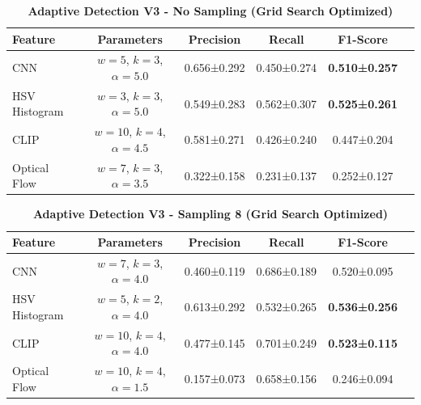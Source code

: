 \documentclass[11pt,a4paper]{article}
\begin{document}
\begin{table}[H]
\centering
\caption{\colorbox{bestresult}{\textbf{Adaptive Detection V3 - No Sampling (Grid Search Optimized)}}}
\label{tab:adaptive_v3_no_sampling}
\small
\begin{tabular}{lccccc}
\toprule
\textbf{Feature} & \textbf{Parameters} & \textbf{Precision} & \textbf{Recall} & \textbf{F1-Score} \\
\midrule
\rowcolor{bestresult}
CNN & $w=5$, $k=3$, $\alpha=5.0$ & 0.656±0.292 & 0.450±0.274 & \textbf{0.510±0.257} \\
\rowcolor{bestresult}
HSV Histogram & $w=3$, $k=3$, $\alpha=5.0$ & 0.549±0.283 & 0.562±0.307 & \textbf{0.525±0.261} \\
CLIP & $w=10$, $k=4$, $\alpha=4.5$ & 0.581±0.271 & 0.426±0.240 & 0.447±0.204 \\
Optical Flow & $w=7$, $k=3$, $\alpha=3.5$ & 0.322±0.158 & 0.231±0.137 & 0.252±0.127 \\
\bottomrule
\end{tabular}
\end{table}

\begin{table}[H]
\centering
\caption{\colorbox{bestresult}{\textbf{Adaptive Detection V3 - Sampling 8 (Grid Search Optimized)}}}
\label{tab:adaptive_v3_sampling}
\small
\begin{tabular}{lccccc}
\toprule
\textbf{Feature} & \textbf{Parameters} & \textbf{Precision} & \textbf{Recall} & \textbf{F1-Score} \\
\midrule
CNN & $w=7$, $k=3$, $\alpha=4.0$ & 0.460±0.119 & 0.686±0.189 & 0.520±0.095 \\
\rowcolor{bestresult}
HSV Histogram & $w=5$, $k=2$, $\alpha=4.0$ & 0.613±0.292 & 0.532±0.265 & \textbf{0.536±0.256} \\
\rowcolor{bestresult}
CLIP & $w=10$, $k=4$, $\alpha=4.0$ & 0.477±0.145 & 0.701±0.249 & \textbf{0.523±0.115} \\
Optical Flow & $w=10$, $k=4$, $\alpha=1.5$ & 0.157±0.073 & 0.658±0.156 & 0.246±0.094 \\
\bottomrule
\end{tabular}
\end{table}

\end{document}

